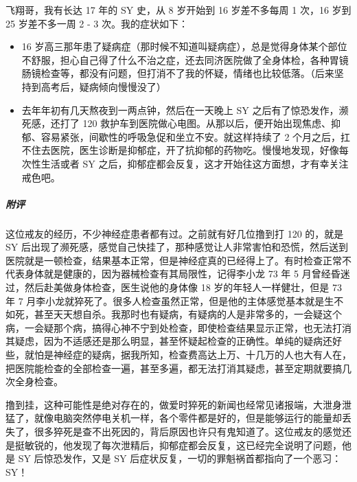 \begin{case}
    飞翔哥，我有长达 17 年的 SY 史，从 8 岁开始到 16 岁差不多每周 1 次，16 岁到 25 岁差不多一周 2 - 3 次。我的症状如下：\begin{itemize}
        \item 16 岁高三那年患了疑病症（那时候不知道叫疑病症），总是觉得身体某个部位不舒服，担心自己得了什么不治之症，还去同济医院做了全身体检，各种胃镜肠镜检查等，都没有问题，但打消不了我的怀疑，情绪也比较低落。（后来坚持到高考后，疑病倾向慢慢没了）
        \item 去年年初有几天熬夜到一两点钟，然后在一天晚上 SY 之后有了惊恐发作，濒死感，还打了 120 救护车到医院做心电图。从那以后，便开始出现焦虑、抑郁、容易紧张，间歇性的呼吸急促和坐立不安。就这样持续了 2 个月之后，扛不住去医院，医生诊断是抑郁症，开了抗抑郁的药物吃。慢慢地发现，好像每次性生活或者 SY 之后，抑郁症都会反复，这才开始往这方面想，才有幸关注戒色吧。
    \end{itemize}
    \subparagraph{附评} 这位戒友的经历，不少神经症患者都有过。之前就有好几位撸到打 120 的，就是 SY 后出现了濒死感，感觉自己快挂了，那种感觉让人非常害怕和恐慌，然后送到医院就是一顿检查，结果基本正常，但是神经症真的已经得上了。有时检查正常不代表身体就是健康的，因为器械检查有其局限性，记得李小龙 73 年 5 月曾经昏迷过，然后赴美做身体检查，医生说他的身体像 18 岁的年轻人一样健壮，但是 73 年 7 月李小龙就猝死了。很多人检查虽然正常，但是他的主体感觉基本就是生不如死，甚至天天想自杀。我那时也有疑病，有疑病的人是非常多的，一会疑这个病，一会疑那个病，搞得心神不宁到处检查，即使检查结果显示正常，也无法打消其疑虑，因为不适感还是那么明显，甚至怀疑起检查的正确性。单纯的疑病还好些，就怕是神经症的疑病，据我所知，检查费高达上万、十几万的人也大有人在，把医院能检查的全部检查一遍，甚至多遍，都无法打消其疑虑，甚至定期就要搞几次全身检查。

    撸到挂，这种可能性是绝对存在的，做爱时猝死的新闻也经常见诸报端，大泄身泄猛了，就像电脑突然停电关机一样，各个零件都是好的，但是能够运行的能量却丢失了，很多猝死是查不出死因的，背后原因也许只有鬼知道了。这位戒友的感觉还是挺敏锐的，他发现了每次泄精后，抑郁症都会反复，这已经完全说明了问题，他是 SY 后惊恐发作，又是 SY 后症状反复，一切的罪魁祸首都指向了一个恶习：SY！
\end{case}

